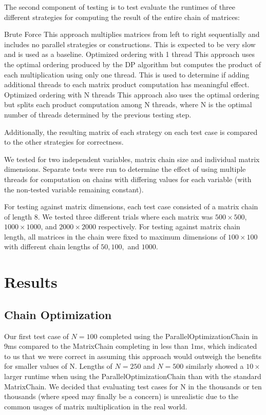 \documentclass[conference,leqno]{IEEEtran}
\begin{document}
The second component of testing is to test evaluate the runtimes of three different strategies for computing the result of the entire chain of matrices:

\begin{outline}[enumerate]
\1 Brute Force
    \2 This approach multiplies matrices from left to right sequentially and includes no parallel strategies or constructions. This is expected to be very slow and is used as a baseline.
\1 Optimized ordering with 1 thread
    \2 This approach uses the optimal ordering produced by the DP algorithm but computes the product of each multiplication using only one thread. This is used to determine if adding additional threads to each matrix product computation has meaningful effect.
\1 Optimized ordering with N threads
    \2 This approach also uses the optimal ordering but splits each product computation among N threads, where N is the optimal number of threads determined by the previous testing step.
\end{outline}

Additionally, the resulting matrix of each strategy on each test case is compared to the other strategies for correctness.

We tested for two independent variables, matrix chain size and individual matrix dimensions. Separate tests were run to determine the effect of using multiple threads for computation on chains with differing values for each variable (with the non-tested variable remaining constant).

For testing against matrix dimensions, each test case consisted of a matrix chain of length $8$. We tested three different trials where each matrix was $500 \times 500$, $1000 \times 1000$, and $2000 \times 2000$ respectively. For testing against matrix chain length, all matrices in the chain were fixed to maximum dimensions of $100 \times 100$ with different chain lengths of $50, 100,$ and $1000$.

\section{Results}
\subsection{Chain Optimization}
Our first test case of $N = 100$ completed using the ParallelOptimizationChain in 9ms compared to the MatrixChain completing in less than 1ms, which indicated to us that we were correct in assuming this approach would outweigh the benefits for smaller values of N. Lengths of $N = 250$ and $N = 500$ similarly showed a $10\times$ larger runtime when using the ParallelOptimizationChain than with the standard MatrixChain. We decided that evaluating test cases for N in the thousands or ten thousands (where speed may finally be a concern) is unrealistic due to the common usages of matrix multiplication in the real world.
\end{document}

